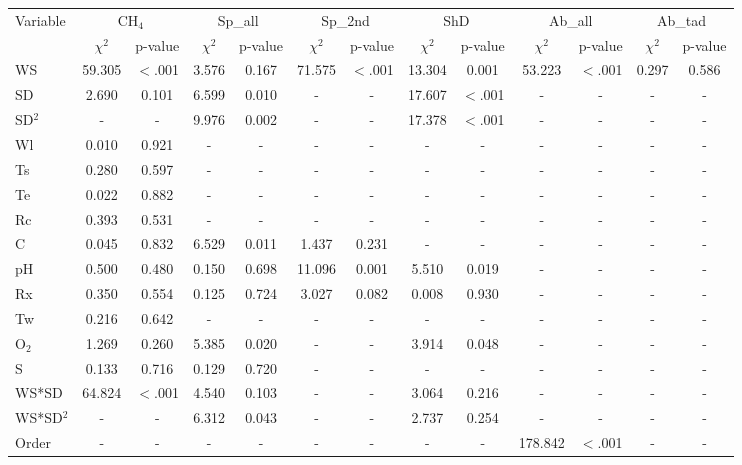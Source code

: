 \begin{table}
    \tiny %
    \renewcommand{\arraystretch}{0.9} %
\begin{tabular}{l cc cc cc cc cc cc}
    \toprule
    Variable & \multicolumn{2}{c}{CH$_{4}$} & \multicolumn{2}{c}{Sp\_all} & \multicolumn{2}{c}{Sp\_2nd} & \multicolumn{2}{c}{ShD} & \multicolumn{2}{c}{Ab\_all} & \multicolumn{2}{c}{Ab\_tad} \\
    & $\chi^2$ & p-value & $\chi^2$ & p-value & $\chi^2$ & p-value & $\chi^2$ & p-value & $\chi^2$ & p-value & $\chi^2$ & p-value \\
    \midrule
    WS & 59.305 & $<$.001 & 3.576 & 0.167 & 71.575 & $<$.001 & 13.304 & 0.001 & 53.223 & $<$.001 & 0.297 & 0.586 \\
    SD & 2.690 & 0.101 & 6.599 & 0.010 & - & - & 17.607 & $<$.001 & - & - & - & - \\
    SD$^2$ & - & - & 9.976 & 0.002 & - & - & 17.378 & $<$.001 & - & - & - & - \\
    Wl & 0.010 & 0.921 & - & - & - & - & - & - & - & - & - & - \\
    Ts & 0.280 & 0.597 & - & - & - & - & - & - & - & - & - & - \\
    Te & 0.022 & 0.882 & - & - & - & - & - & - & - & - & - & - \\
    Rc & 0.393 & 0.531 & - & - & - & - & - & - & - & - & - & - \\
    C & 0.045 & 0.832 & 6.529 & 0.011 & 1.437 & 0.231 & - & - & - & - & - & - \\
    pH & 0.500 & 0.480 & 0.150 & 0.698 & 11.096 & 0.001 & 5.510 & 0.019 & - & - & - & - \\
    Rx & 0.350 & 0.554 & 0.125 & 0.724 & 3.027 & 0.082 & 0.008 & 0.930 & - & - & - & - \\
    Tw & 0.216 & 0.642 & - & - & - & - & - & - & - & - & - & - \\
    O$_{2}$ & 1.269 & 0.260 & 5.385 & 0.020 & - & - & 3.914 & 0.048 & - & - & - & - \\
    S & 0.133 & 0.716 & 0.129 & 0.720 & - & - & - & - & - & - & - & - \\
    WS*SD & 64.824 & $<$.001 & 4.540 & 0.103 & - & - & 3.064 & 0.216 & - & - & - & - \\
    WS*SD$^2$ & - & - & 6.312 & 0.043 & - & - & 2.737 & 0.254 & - & - & - & - \\
    Order & - & - & - & - & - & - & - & - & 178.842 & $<$.001 & - & - \\

\end{tabular}
\end{table}
